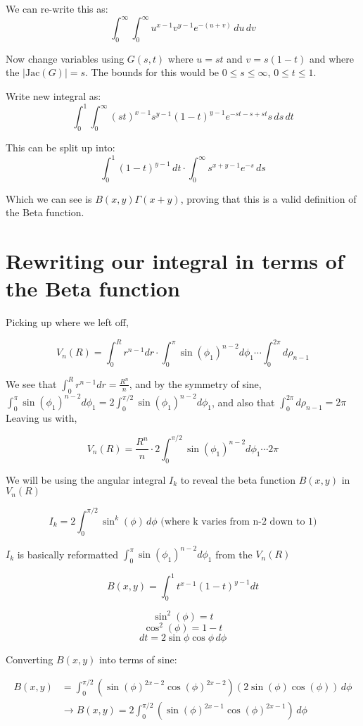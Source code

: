 \documentclass{article}
\begin{document}
We can re-write this as:
\[
\int_0^\infty\int_0^\infty u^{x-1}v^{y-1}e^{-(u+v)}\,du\,dv
\]

Now change variables using $G(s,t)$ where $u=st$ and $v=s(1-t)$ and where the $|\text{Jac}(G)| = s$. The bounds for this would be $0\leq s\leq\infty$, $0\leq t\leq 1$.

Write new integral as:
\[
\int_0^1\int_0^\infty (st)^{x-1}s^{y-1}(1-t)^{y-1}e^{-st-s+st}s\,ds\,dt
\]

This can be split up into:
\[
\int_0^1(1-t)^{y-1}\,dt \cdot \int_0^\infty s^{x+y-1}e^{-s}\,ds
\]

Which we can see is $B(x,y)\Gamma(x+y)$, proving that this is a valid definition of the Beta function.



\section*{Rewriting our integral in terms of the Beta function}


Picking up where we left off, 

\[V_n(R) = \int_0^R r^{n-1}dr \cdot \int_0^\pi \sin(\phi_1)^{n-2} d\phi_1 \cdots \int_0^{2\pi} d\rho_{n-1}\]

We see that $\int_0^R r^{n-1}dr = \frac{R^n}{n}$, and by the symmetry of sine, $\int_0^\pi \sin(\phi_1)^{n-2}d\phi_1 = 2 \int_0^{\pi/2} \sin(\phi_1)^{n-2} d\phi_1$, and also that $\int_0^{2\pi} d\rho_{n-1} = 2\pi$ Leaving us with,

\[V_n(R) = \frac{R^n}{n} \cdot 2\int_0^{\pi/2}\sin(\phi_1)^{n-2} d\phi_1 \cdots 2\pi\]

We will be using the angular integral $I_k$ to reveal the beta function $B(x,y)$ in $V_n(R)$

\[I_k = 2 \int_0^{\pi/2} \sin^k(\phi) \, d\phi \text{ (where k varies from n-2 down to 1)}\]

$I_k$ is basically reformatted $\int_0^\pi \sin(\phi_1)^{n-2} d\phi_1$ from the $V_n(R)$

\[B(x,y) = \int_0^1 t^{x-1} (1-t)^{y-1} dt\]

\[\sin^2(\phi) = t\]
\[\cos^2(\phi) = 1 - t\]
\[dt = 2\sin\phi \cos\phi \, d\phi\]

Converting $B(x,y)$ into terms of sine:

\begin{align*}
B(x,y) &= \int_0^{\pi/2} (\sin(\phi)^{2x-2} \cos(\phi)^{2x-2})(2\sin(\phi)\cos(\phi)) \, d\phi \\
&\rightarrow B(x,y) = 2 \int_0^{\pi/2} (\sin(\phi)^{2x-1} \cos(\phi)^{2x-1}) \, d\phi
\end{align*}
\end{document}
